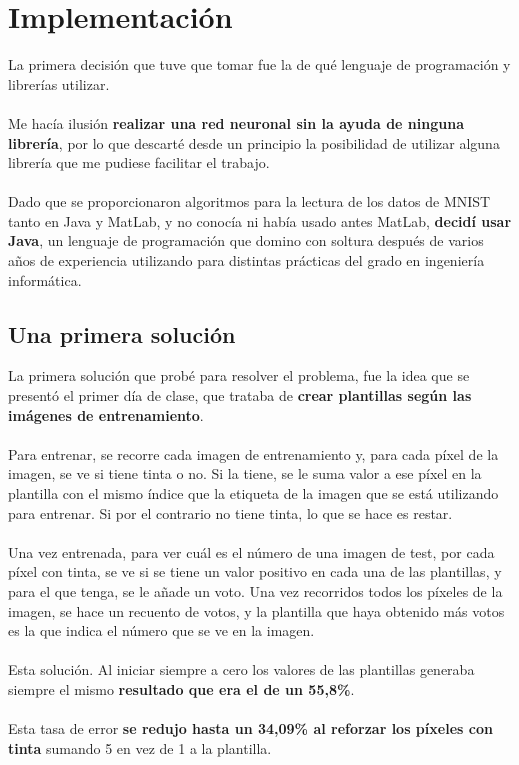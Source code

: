 \section{Implementación}

La primera decisión que tuve que tomar fue la de qué lenguaje de programación y librerías utilizar. 
\\ \\
Me hacía ilusión \textbf{realizar una red neuronal sin la ayuda de ninguna librería}, por lo que descarté desde un principio la posibilidad de utilizar alguna librería que me pudiese facilitar el trabajo. 
\\ \\
Dado que se proporcionaron algoritmos para la lectura de los datos de MNIST tanto en Java y MatLab, y no conocía ni había usado antes MatLab, \textbf{decidí usar Java}, un lenguaje de programación que domino con soltura después de varios años de experiencia utilizando para distintas prácticas del grado en ingeniería informática.

\subsection{Una primera solución}

La primera solución que probé para resolver el problema, fue la idea que se presentó el primer día de clase, que trataba de \textbf{crear plantillas según las imágenes de entrenamiento}.
\\ \\
Para entrenar, se recorre cada imagen de entrenamiento y, para cada píxel de la imagen, se ve si tiene tinta o no. Si la tiene, se le suma valor a ese píxel en la plantilla con el mismo índice que la etiqueta de la imagen que se está utilizando para entrenar. Si por el contrario no tiene tinta, lo que se hace es restar.
\\ \\
Una vez entrenada, para ver cuál es el número de una imagen de test, por cada píxel con tinta, se ve si se tiene un valor positivo en cada una de las plantillas, y para el que tenga, se le añade un voto. Una vez recorridos todos los píxeles de la imagen, se hace un recuento de votos, y la plantilla que haya obtenido más votos es la que indica el número que se ve en la imagen.
\\ \\
Esta solución. Al iniciar siempre a cero los valores de las plantillas generaba siempre el mismo \textbf{resultado que era el de un 55,8\%}.
\\ \\
Esta tasa de error \textbf{se redujo hasta un 34,09\% al reforzar los píxeles con tinta} sumando 5 en vez de 1 a la plantilla.

